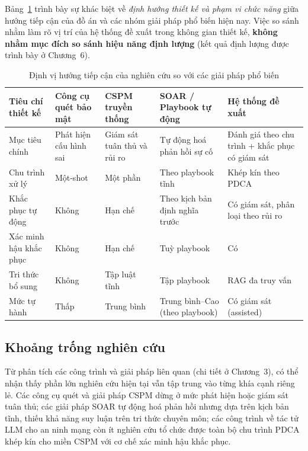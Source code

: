 Bảng~\ref{tab:design-positioning} trình bày sự khác biệt về \textit{định hướng thiết kế và phạm vi chức năng} giữa hướng tiếp cận của đồ án và các nhóm giải pháp phổ biến hiện nay. Việc so sánh nhằm làm rõ vị trí của hệ thống đề xuất trong không gian thiết kế, \textbf{không nhằm mục đích so sánh hiệu năng định lượng} (kết quả định lượng được trình bày ở Chương~6).

\begin{table}[!htb]
  \centering
  \caption{Định vị hướng tiếp cận của nghiên cứu so với các giải pháp phổ biến}
  \label{tab:design-positioning}
  \small
  \begin{tabular}{|p{2.8cm}|p{2.4cm}|p{2.6cm}|p{2.6cm}|p{2.8cm}|}
    \hline
    \textbf{Tiêu chí thiết kế} &
    \textbf{Công cụ quét bảo mật} &
    \textbf{CSPM truyền thống} &
    \textbf{SOAR / Playbook tự động} &
    \textbf{Hệ thống đề xuất} \\ \hline

    Mục tiêu chính &
    Phát hiện cấu hình sai &
    Giám sát tuân thủ và rủi ro &
    Tự động hoá phản hồi sự cố &
    Đánh giá theo chu trình + khắc phục có giám sát \\ \hline

    Chu trình xử lý &
    Một-shot &
    Một phần &
    Theo playbook tĩnh &
    Khép kín theo PDCA \\ \hline

    Khắc phục tự động &
    Không &
    Hạn chế &
    Theo kịch bản định nghĩa trước &
    Có giám sát, phân loại theo rủi ro \\ \hline

    Xác minh hậu khắc phục &
    Không &
    Hạn chế &
    Tuỳ playbook &
    Có \\ \hline

    Tri thức bổ sung &
    Không &
    Tập luật tĩnh &
    Tập playbook &
    RAG đa truy vấn \\ \hline

    Mức tự hành &
    Thấp &
    Trung bình &
    Trung bình--Cao (theo playbook) &
    Có giám sát (assisted) \\ \hline
  \end{tabular}
\end{table}

\subsection*{Khoảng trống nghiên cứu}

Từ phân tích các công trình và giải pháp liên quan (chi tiết ở Chương~3), có thể nhận thấy phần lớn nghiên cứu hiện tại vẫn tập trung vào từng khía cạnh riêng lẻ. Các công cụ quét và giải pháp CSPM dừng ở mức phát hiện hoặc giám sát tuân thủ; các giải pháp SOAR tự động hoá phản hồi nhưng dựa trên kịch bản tĩnh, thiếu khả năng suy luận trên tri thức chuyên môn; các công trình về tác tử LLM cho an ninh mạng còn ít nghiên cứu tổ chức được toàn bộ chu trình PDCA khép kín cho miền CSPM với cơ chế xác minh hậu khắc phục.

